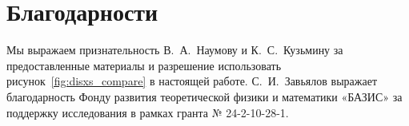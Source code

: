\section*{Благодарности}
Мы выражаем признательность В.~А.~Наумову и К.~С.~Кузьмину за предоставленные материалы и разрешение использовать рисунок~\ref{fig:disxs_compare} в настоящей работе.
С.~И.~Завьялов выражает благодарность Фонду развития теоретической физики и математики «БАЗИС» за поддержку исследования в рамках гранта № 24-2-10-28-1.